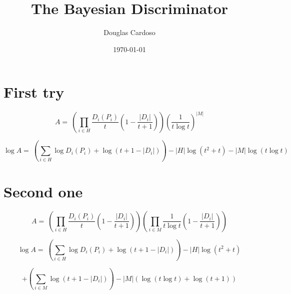 \documentclass{article}
\begin{document}
   \title{The Bayesian Discriminator}
   \author{Douglas Cardoso}
   \date{\today}
   \maketitle

   \section{First try}

      $$
      A = \
         \left(
            \prod_{i \in H} \frac{D_i(P_i)}{t}
            \left( 1 - \frac{|D_i|}{t+1} \right)
         \right)
         \left(
            \frac{1}{t \log t}
         \right) ^ {|M|}
      $$

      $$
      \log A = \
         \left(
            \sum_{i \in H} \log D_i(P_i) +
            \log \left(t + 1 - |D_i|\right)
         \right)
         - |H| \log (t^2 + t)
         - |M| \log (t \log t)
      $$

   \section{Second one}

      $$
      A = \
         \left(
            \prod_{i \in H} \frac{D_i(P_i)}{t}
            \left( 1 - \frac{|D_i|}{t+1} \right)
         \right)
         \left(
            \prod_{i \in M} \frac{1}{t \log t}
            \left( 1 - \frac{|D_i|}{t+1} \right)
         \right)
      $$

      $$
      \log A = \
         \left(
            \sum_{i \in H} \log D_i(P_i) +
            \log \left(t + 1 - |D_i|\right)
         \right)
         - |H| \log (t^2 + t)
      $$

      $$
         + \left(\sum_{i \in M} \log \left(t + 1 - |D_i|\right)
         \right)
         - |M| (\log (t \log t) + \log (t + 1))
      $$
\end{document}
